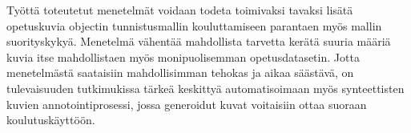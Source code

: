 Työttä toteutetut menetelmät voidaan todeta toimivaksi tavaksi lisätä opetuskuvia objectin tunnistusmallin kouluttamiseen parantaen myös mallin suorityskykyä. Menetelmä vähentää mahdollista tarvetta kerätä suuria määriä kuvia itse mahdollistaen myös monipuolisemman opetusdatasetin. Jotta menetelmästä saataisiin mahdollisimman tehokas ja aikaa säästävä, on tulevaisuuden tutkimukissa tärkeä keskittyä automatisoimaan myös synteettisten kuvien annotointiprosessi, jossa generoidut kuvat voitaisiin ottaa suoraan koulutuskäyttöön.
